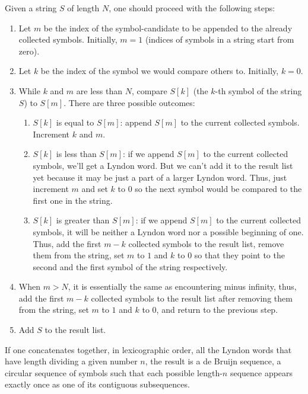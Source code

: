 Given a string $S$ of length $N$, one should proceed with the following steps:

\begin{enumerate}
\item Let $m$ be the index of the symbol-candidate to be appended to the already collected symbols. Initially, $m = 1$ (indices of symbols in a string start from zero).
\item Let $k$ be the index of the symbol we would compare others to. Initially, $k = 0$.
\item While $k$ and $m$ are less than $N$, compare $S[k]$ (the $k$-th symbol of the string $S$) to $S[m]$. There are three possible outcomes:
\begin{enumerate}
\item $S[k]$ is equal to $S[m]$: append $S[m]$ to the current collected symbols. Increment $k$ and $m$.
\item $S[k]$ is less than $S[m]$: if we append $S[m]$ to the current collected symbols, we'll get a Lyndon word. But we can't add it to the result list yet because it may be just a part of a larger Lyndon word. Thus, just increment $m$ and set $k$ to $0$ so the next symbol would be compared to the first one in the string.
\item $S[k]$ is greater than $S[m]$: if we append $S[m]$ to the current collected symbols, it will be neither a Lyndon word nor a possible beginning of one. Thus, add the first $m-k$ collected symbols to the result list, remove them from the string, set $m$ to $1$ and $k$ to $0$ so that they point to the second and the first symbol of the string respectively.
\end{enumerate}
\item When $m > N$, it is essentially the same as encountering minus infinity, thus, add the first $m-k$ collected symbols to the result list after removing them from the string, set $m$ to $1$ and $k$ to $0$, and return to the previous step.
\item Add $S$ to the result list.
\end{enumerate}

If one concatenates together, in lexicographic order, all the Lyndon words that have length dividing a given number $n$, the result is a de Bruijn sequence, a circular sequence of symbols such that each possible length-$n$ sequence appears exactly once as one of its contiguous subsequences.

